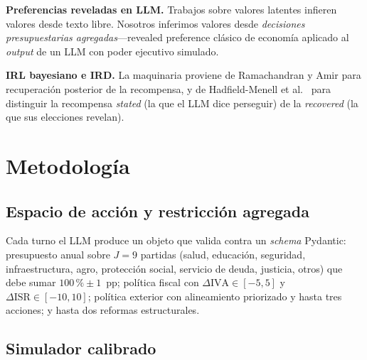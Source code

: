 \documentclass[conference]{IEEEtran}
\begin{document}
\textbf{Preferencias reveladas en LLM.} Trabajos sobre valores latentes
\cite{perez2022} infieren valores desde texto libre. Nosotros inferimos
valores desde \emph{decisiones presupuestarias agregadas}---revealed
preference cl\'asico de econom\'ia aplicado al \emph{output} de un LLM
con poder ejecutivo simulado.

\textbf{IRL bayesiano e IRD.} La maquinaria proviene de
Ramachandran y Amir \cite{ramachandran2007} para recuperaci\'on
posterior de la recompensa, y de Hadfield-Menell et al.\
\cite{hadfield2017} para distinguir la recompensa \emph{stated} (la que
el LLM dice perseguir) de la \emph{recovered} (la que sus elecciones
revelan).

\section{Metodolog\'ia}

\subsection{Espacio de acci\'on y restricci\'on agregada}

Cada turno el LLM produce un objeto que valida contra un
\emph{schema} Pydantic: presupuesto anual sobre $J{=}9$ partidas
(salud, educaci\'on, seguridad, infraestructura, agro, protecci\'on
social, servicio de deuda, justicia, otros) que debe sumar
$100\,\% \pm 1$~pp; pol\'itica fiscal con $\Delta\text{IVA}\in[-5,5]$ y
$\Delta\text{ISR}\in[-10,10]$; pol\'itica exterior con alineamiento
priorizado y hasta tres acciones; y hasta dos reformas estructurales.

\subsection{Simulador calibrado}
\end{document}
